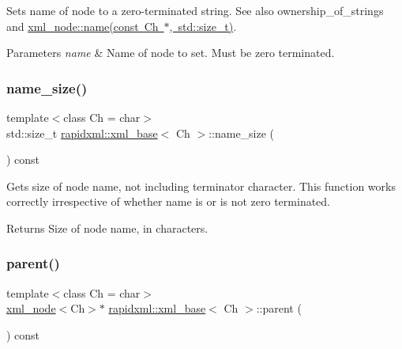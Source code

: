 Sets name of node to a zero-\/terminated string. See also ownership\+\_\+of\+\_\+strings and \mbox{\hyperlink{classrapidxml_1_1xml__base_ae55060ae958c6e6465d6c8db852ec6ce}{xml\+\_\+node\+::name(const Ch $\ast$, std\+::size\+\_\+t)}}. 
\begin{DoxyParams}{Parameters}
{\em name} & Name of node to set. Must be zero terminated. \\
\hline
\end{DoxyParams}
\mbox{\label{classrapidxml_1_1xml__base_a20c8ffbe0c7a0b4231681ab8b99330a4}} 
\subsubsection{\texorpdfstring{name\+\_\+size()}{name\_size()}}
{\footnotesize\ttfamily template$<$class Ch  = char$>$ \\
std\+::size\+\_\+t \mbox{\hyperlink{classrapidxml_1_1xml__base}{rapidxml\+::xml\+\_\+base}}$<$ Ch $>$\+::name\+\_\+size (\begin{DoxyParamCaption}{ }\end{DoxyParamCaption}) const\hspace{0.3cm}{\ttfamily [inline]}}

Gets size of node name, not including terminator character. This function works correctly irrespective of whether name is or is not zero terminated. \begin{DoxyReturn}{Returns}
Size of node name, in characters. 
\end{DoxyReturn}
\mbox{\label{classrapidxml_1_1xml__base_aa807062868d671a8c798d9d1bf016988}} 
\subsubsection{\texorpdfstring{parent()}{parent()}}
{\footnotesize\ttfamily template$<$class Ch  = char$>$ \\
\mbox{\hyperlink{classrapidxml_1_1xml__node}{xml\+\_\+node}}$<$Ch$>$$\ast$ \mbox{\hyperlink{classrapidxml_1_1xml__base}{rapidxml\+::xml\+\_\+base}}$<$ Ch $>$\+::parent (\begin{DoxyParamCaption}{ }\end{DoxyParamCaption}) const\hspace{0.3cm}{\ttfamily [inline]}}

